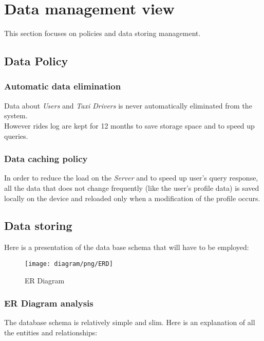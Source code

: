 \section{Data management view} %
\label{sec:data_management}
This section focuses on policies and data storing management.\\
\subsection{Data Policy} %
\label{sub:data_policy}
\subsubsection{Automatic data elimination} %
\label{ssub:data_elimination}
Data about \emph{Users} and \emph{Taxi Drivers} is never automatically eliminated from the system.\\
However rides log are kept for 12 months to save storage space and to speed up queries.
\subsubsection{Data caching policy} %
\label{ssub:data_caching}
In order to reduce the load on the \emph{Server} and to speed up user's query response, all the data that does not change frequently (like the user's profile data) is saved locally on the device and reloaded only when a modification of the profile occurs.

\subsection{Data storing} %
Here is a presentation of the data base schema that will have to be employed:
\newpage
\label{sub:data_storing}
\begin{figure}[h!t]
\caption{ER Diagram}
\texttt{[image: diagram/png/ERD]}
\centering
\end{figure}
\newpage

\subsubsection{ER Diagram analysis} %
\label{ssub:er_diagram_analysis}

The database schema is relatively simple and slim.
Here is an explanation of all the entities and relationships:

